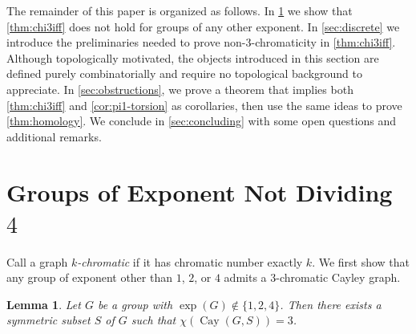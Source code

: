 \documentclass[12pt,letterpaper]{amsart}
\newtheorem{lemma}[theorem]{Lemma}
\theoremstyle{definition}
\theoremstyle{remark}
\DeclareMathOperator{\Cay}{Cay}
\begin{document}
The remainder of this paper is organized as follows.
In \cref{sec:3-chromatic} we show that \cref{thm:chi3iff} does not hold for groups of any other exponent. 
In \cref{sec:discrete} we introduce the preliminaries needed to prove non-3-chromaticity in \cref{thm:chi3iff}. Although topologically motivated, the objects introduced in this section are defined purely combinatorially and require no topological background to appreciate.
In \cref{sec:obstructions}, we prove a theorem that implies both \cref{thm:chi3iff} and \cref{cor:pi1-torsion} as corollaries, then use the same ideas to prove \cref{thm:homology}. 
We conclude in \cref{sec:concluding} with some open questions and additional remarks.




\section{Groups of Exponent Not Dividing $4$}\label{sec:3-chromatic}

Call a graph \emph{$k$-chromatic} if it has chromatic number exactly $k$. We first show that any group of exponent other than $1$, $2$, or $4$ admits a 3-chromatic Cayley graph.

\begin{lemma}\label{lem:3-chromatic}
Let $G$ be a group with $\exp(G)\notin\{1,2,4\}$. Then there exists a symmetric subset $S$ of $G$ such that $\chi(\Cay(G,S))=3$.
\end{lemma}
\end{document}
